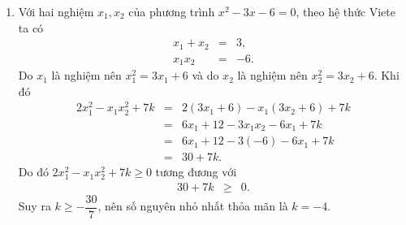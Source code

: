 \begin{bt}[2,0 điểm]
{\begin{enumerate}[1.]
\begin{enumerate}
\begin{eqnarray*}
                                \dfrac{\sqrt{x}+1}{2(\sqrt{x}-1)}&<&0.
                            \end{eqnarray*}
                            Vì tử thức $\sqrt{x}+1>0$ với mọi $x\ge 0$, nên dấu biểu thức phụ thuộc vào mẫu thức. Do đó
                            \begin{eqnarray*}
                                \sqrt{x}-1&<&0\\
                                \sqrt{x}&<&1 \\
                                0\le x &<&1
                            \end{eqnarray*}
                            Vậy $0\le x<1$ là giá trị cần tìm.
                  \end{enumerate}
            \item Với hai nghiệm $x_1,x_2$ của phương trình $x^2-3x-6=0$, theo hệ thức Viete ta có
                  \begin{eqnarray*}
                      x_1+x_2&=&3,\\
                      x_1x_2&=&-6.
                  \end{eqnarray*}
                  Do $x_1$ là nghiệm nên $x_1^2=3x_1+6$ và do $x_2$ là nghiệm nên $x_2^2=3x_2+6$. Khi đó
                  \begin{eqnarray*}
                      2x_1^2-x_1x_2^2+7k &=&2(3x_1+6)-x_1(3x_2+6)+7k\\
                      &=&6x_1+12-3x_1x_2-6x_1+7k\\
                      &=&6x_1+12-3(-6)-6x_1+7k\\
                      &=&30+7k.
                  \end{eqnarray*}
                  Do đó $2x_1^2-x_1x_2^2+7k\ge 0$ tương đương với
                  \begin{eqnarray*}
                      30+7k&\ge&0.
                  \end{eqnarray*}
                  Suy ra $k\ge -\dfrac{30}{7}$, nên số nguyên nhỏ nhất thỏa mãn là $k=-4$.
        \end{enumerate}
    }
\end{bt}

